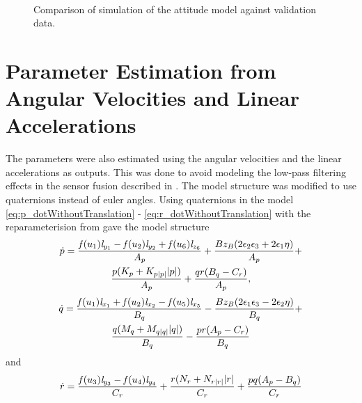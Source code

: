 \begin{figure}[tbp]
  \centering
  \qquad
  \\
  \caption{\label{fig:velocityCompareCong}%
    Comparison of simulation of the attitude model against validation data.}
\end{figure}

\section{Parameter Estimation from Angular Velocities and Linear Accelerations} \label{sec:angLinEstim}
The parameters were also estimated using the angular velocities and the linear accelerations as outputs. This was done to avoid modeling the low-pass filtering effects in the sensor fusion described in . The model structure was modified to use quaternions instead of euler angles. Using quaternions in the model \eqref{eq:p_dotWithoutTranslation} - \eqref{eq:r_dotWithoutTranslation} with the reparameterision from  gave the model structure 
\begin{multline}
\dot{p} = \frac{\mathit{f}(u_{1}) \mathit{l}_{y_{1}} - \mathit{f}(u_{2}) \mathit{l}_{y_{2}} + \mathit{f}(u_{6}) \mathit{l}_{z_{6}}}{A_p} + \frac{B z_B (2 \epsilon_2 \epsilon_3 + 2 \epsilon_1 \eta)}{A_p} + \\ \frac{p (K_{p} + K_{p|p|} |p|)}{A_p} + \frac{q r (B_q - C_r)}{A_p},
\end{multline}
\begin{multline}
\dot{q} = \frac{\mathit{f}(u_{1}) \mathit{l}_{x_{1}} + \mathit{f}(u_{2}) \mathit{l}_{x_{2}} - \mathit{f}(u_{5}) \mathit{l}_{x_{5}}}{B_q} - \frac{B z_B (2 \epsilon_1 \epsilon_3 - 2 \epsilon_2 \eta)}{B_q} + \\ \frac{q (M_{q} + M_{q|q|} |q|)}{B_q} - \frac{p r (A_p - C_r)}{B_q}
\end{multline}
and
\begin{multline}
\dot{r} = \frac{\mathit{f}(u_{3}) \mathit{l}_{y_{3}} - \mathit{f}(u_{4}) \mathit{l}_{y_{4}}}{C_r} + \frac{r (N_{r} + N_{r|r|} |r|}{C_r} + \frac{p q (A_p  - B_q)}{C_r}
\end{multline}

